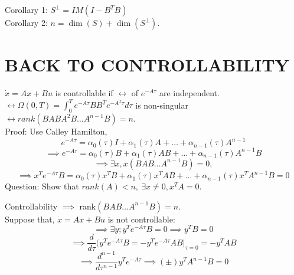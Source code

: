\documentclass{article}
\begin{document}
Corollary 1: $S^\bot=IM(I-B^TB)$\\
Corollary 2: $n=\dim(S)+\dim(S^\bot)$.\\

\section{BACK TO CONTROLLABILITY}
$\dot{x}=Ax+Bu$ is controllable if $\leftrightarrow$ of $e^{-A\tau}$ are independent.\\
$\leftrightarrow \Omega(0,T)=\int_0^Te^{-A\tau}BB^Te^{-A^T\tau}d\tau$ is non-singular\\
$\leftrightarrow rank (B AB A^2B\dots A^{n-1}B)=n$.\\
Proof: Use Calley Hamilton,\\
\[e^{-A\tau}=\alpha_0(\tau)I+\alpha_1(\tau)A+\dots+\alpha_{n-1}(\tau)A^{n-1}\]
\[\implies e^{-A\tau}=\alpha_0(\tau)B+\alpha_1(\tau)AB+\dots+\alpha_{n-1}(\tau)A^{n-1}B\]
\[\implies \exists x, x(B AB \dots A^{n-1}B)=0,\]
\[\implies x^Te^{-A\tau}B=\alpha_0(\tau)x^TB+\alpha_1(\tau)x^TAB+\dots+\alpha_{n-1}(\tau)x^TA^{n-1}B=0\]
Question: Show that $rank(A)<n,\ \exists x\neq 0, x^TA=0$.


Controllability $\implies$ rank$(B AB\dots A^{n-1}B)=n$.\\

Suppose that, $\dot{x}=Ax+Bu$ is not controllable:\\
\[\implies \exists y; y^Te^{-A\tau}B=0\implies y^TB=0\]
\[\implies \frac{d}{d\tau}(y^Te^{-A\tau}B=-y^Te^{-A\tau}AB\bigg|_{\tau=0}=-y^TAB\]
\[\implies \frac{d^{n-1}}{d\tau^{n-1}}y^Te^{-A\tau}\implies (\pm)y^TA^{n-1}B=0\]
\end{document}
